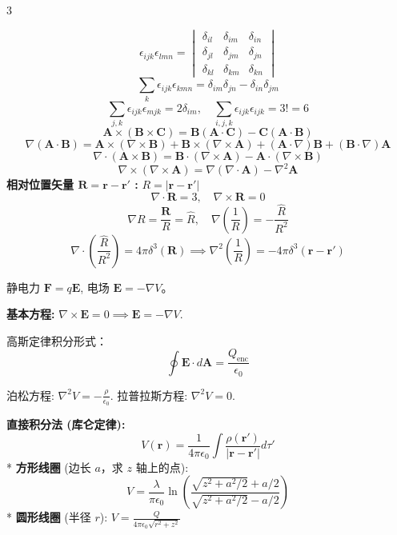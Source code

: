 \documentclass[10pt,a4paper,landscape,utf8]{ctexart}
\newcommand{\bs}[1]{\boldsymbol{#1}}
\begin{document}
\scriptsize %
\setlength{\parindent}{0pt}
\setlength{\columnsep}{0.6cm}
\setlength{\columnseprule}{0.4pt}

\begin{multicols*}{3}

$$ \epsilon_{ijk}\epsilon_{lmn} = \begin{vmatrix} \delta_{il} & \delta_{im} & \delta_{in} \\ \delta_{jl} & \delta_{jm} & \delta_{jn} \\ \delta_{kl} & \delta_{km} & \delta_{kn} \end{vmatrix} $$
$$ \sum_{k} \epsilon_{ijk}\epsilon_{kmn} = \delta_{im}\delta_{jn} - \delta_{in}\delta_{jm} $$
$$ \sum_{j,k} \epsilon_{ijk}\epsilon_{mjk} = 2\delta_{im}, \quad \sum_{i,j,k} \epsilon_{ijk}\epsilon_{ijk} = 3! = 6 $$
$$ \bs{A}\times(\bs{B}\times\bs{C}) = \bs{B}(\bs{A}\cdot\bs{C}) - \bs{C}(\bs{A}\cdot\bs{B}) $$
$$ \nabla(\bs{A}\cdot\bs{B}) = \bs{A}\times(\nabla\times\bs{B}) + \bs{B}\times(\nabla\times\bs{A}) + (\bs{A}\cdot\nabla)\bs{B} + (\bs{B}\cdot\nabla)\bs{A} $$
$$ \nabla \cdot (\bs{A} \times \bs{B}) = \bs{B} \cdot (\nabla \times \bs{A}) - \bs{A} \cdot (\nabla \times \bs{B}) $$
$$ \nabla \times (\nabla \times \bs{A}) = \nabla(\nabla \cdot \bs{A}) - \nabla^2\bs{A} $$
\textbf{相对位置矢量 $\bs{R} = \bs{r} - \bs{r}'$ :} $R = |\bs{r} - \bs{r}'|$
$$ \nabla \cdot \bs{R} = 3, \quad \nabla \times \bs{R} = 0 $$
$$ \nabla R = \frac{\bs{R}}{R} = \hat{R}, \quad \nabla \left(\frac{1}{R}\right) = -\frac{\hat{R}}{R^2} $$
$$ \nabla \cdot \left(\frac{\hat{R}}{R^2}\right) = 4\pi\delta^3(\bs{R}) \implies \nabla^2 \left(\frac{1}{R}\right) = -4\pi\delta^3(\bs{r} - \bs{r}') $$


静电力 $\bs{F} = q\bs{E}$, 电场 $\bs{E} = -\nabla V$。

\textbf{基本方程:} $\nabla \times \bs{E} = 0 \implies \bs{E} = -\nabla V$.

高斯定律积分形式：$$ \oint \bs{E} \cdot d\bs{A} = \frac{Q_{\text{enc}}}{\epsilon_0} $$

泊松方程: $\nabla^2 V = -\frac{\rho}{\epsilon_0}$. 拉普拉斯方程: $\nabla^2 V = 0$.

\textbf{直接积分法 (库仑定律):}
$$ V(\bs{r}) = \frac{1}{4\pi\epsilon_0} \int \frac{\rho(\bs{r}')}{|\bs{r}-\bs{r}'|} d\tau' $$
* \textbf{方形线圈} (边长 $a$，求 $z$ 轴上的点): 
$$V = \frac{\lambda}{\pi\epsilon_0}\ln\left(\frac{\sqrt{z^2+a^2/2}+a/2}{\sqrt{z^2+a^2/2}-a/2}\right)$$
* \textbf{圆形线圈} (半径 $r$): $V = \frac{Q}{4\pi\epsilon_0\sqrt{r^2+z^2}}$


\end{multicols*}
\end{document}
